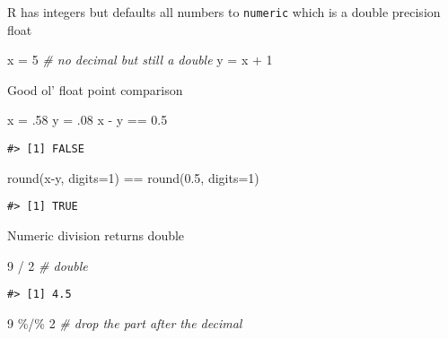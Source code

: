 \documentclass[
]{book}
\newenvironment{Shaded}{\begin{snugshade}}{\end{snugshade}}
\newcommand{\AttributeTok}[1]{\textcolor[rgb]{0.77,0.63,0.00}{#1}}
\newcommand{\CommentTok}[1]{\textcolor[rgb]{0.56,0.35,0.01}{\textit{#1}}}
\newcommand{\DecValTok}[1]{\textcolor[rgb]{0.00,0.00,0.81}{#1}}
\newcommand{\FloatTok}[1]{\textcolor[rgb]{0.00,0.00,0.81}{#1}}
\newcommand{\FunctionTok}[1]{\textcolor[rgb]{0.00,0.00,0.00}{#1}}
\newcommand{\NormalTok}[1]{#1}
\newcommand{\OtherTok}[1]{\textcolor[rgb]{0.56,0.35,0.01}{#1}}
\newcommand{\SpecialCharTok}[1]{\textcolor[rgb]{0.00,0.00,0.00}{#1}}
\begin{document}
R has integers but defaults all numbers to \texttt{numeric} which is a double precision float

\begin{Shaded}
\begin{Highlighting}[]
\NormalTok{x }\OtherTok{=} \DecValTok{5} \CommentTok{\# no decimal but still a double}
\NormalTok{y }\OtherTok{=}\NormalTok{ x }\SpecialCharTok{+} \DecValTok{1}
\end{Highlighting}
\end{Shaded}

Good ol' float point comparison

\begin{Shaded}
\begin{Highlighting}[]
\NormalTok{x }\OtherTok{=}\NormalTok{ .}\DecValTok{58}
\NormalTok{y }\OtherTok{=}\NormalTok{ .}\DecValTok{08}
\NormalTok{x }\SpecialCharTok{{-}}\NormalTok{ y }\SpecialCharTok{==} \FloatTok{0.5}
\end{Highlighting}
\end{Shaded}

\begin{verbatim}
#> [1] FALSE
\end{verbatim}

\begin{Shaded}
\begin{Highlighting}[]
\FunctionTok{round}\NormalTok{(x}\SpecialCharTok{{-}}\NormalTok{y, }\AttributeTok{digits=}\DecValTok{1}\NormalTok{) }\SpecialCharTok{==} \FunctionTok{round}\NormalTok{(}\FloatTok{0.5}\NormalTok{, }\AttributeTok{digits=}\DecValTok{1}\NormalTok{)}
\end{Highlighting}
\end{Shaded}

\begin{verbatim}
#> [1] TRUE
\end{verbatim}

Numeric division returns double

\begin{Shaded}
\begin{Highlighting}[]
\DecValTok{9} \SpecialCharTok{/} \DecValTok{2} \CommentTok{\# double}
\end{Highlighting}
\end{Shaded}

\begin{verbatim}
#> [1] 4.5
\end{verbatim}

\begin{Shaded}
\begin{Highlighting}[]
\DecValTok{9} \SpecialCharTok{\%/\%} \DecValTok{2} \CommentTok{\# drop the part after the decimal}
\end{Highlighting}
\end{Shaded}
\end{document}
